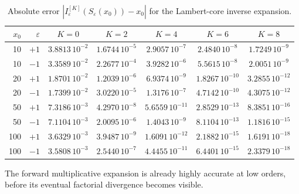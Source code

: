 \documentclass[11pt]{article}
\theoremstyle{definition}
\theoremstyle{remark}
\newcommand{\eps}{\varepsilon}
\begin{document}
\begin{table}[htbp]
\centering
\caption{Absolute error $|I_\eps^{[K]}(S_\eps(x_0))-x_0|$ for the Lambert-core inverse expansion.}
\label{tab:inverse-errors}
\small
\begin{tabular}{@{}rrccccc@{}}
\toprule
$x_0$ & $\eps$ & $K=0$ & $K=2$ & $K=4$ & $K=6$ & $K=8$\\
\midrule
10  & $+1$ & $3.8813\,10^{-2}$ & $1.6744\,10^{-5}$ & $2.9057\,10^{-7}$ & $2.4840\,10^{-8}$ & $1.7249\,10^{-9}$\\
10  & $-1$ & $3.3589\,10^{-2}$ & $2.2677\,10^{-4}$ & $3.9282\,10^{-6}$ & $5.5615\,10^{-8}$ & $2.0051\,10^{-9}$\\
20  & $+1$ & $1.8701\,10^{-2}$ & $1.2039\,10^{-6}$ & $6.9374\,10^{-9}$ & $1.8267\,10^{-10}$ & $3.2855\,10^{-12}$\\
20  & $-1$ & $1.7399\,10^{-2}$ & $3.0220\,10^{-5}$ & $1.3176\,10^{-7}$ & $4.7142\,10^{-10}$ & $4.3075\,10^{-12}$\\
50  & $+1$ & $7.3186\,10^{-3}$ & $4.2970\,10^{-8}$ & $5.6559\,10^{-11}$ & $2.8529\,10^{-13}$ & $8.3851\,10^{-16}$\\
50  & $-1$ & $7.1104\,10^{-3}$ & $2.0095\,10^{-6}$ & $1.4043\,10^{-9}$ & $8.1104\,10^{-13}$ & $1.1816\,10^{-15}$\\
100 & $+1$ & $3.6329\,10^{-3}$ & $3.9487\,10^{-9}$ & $1.6091\,10^{-12}$ & $2.1882\,10^{-15}$ & $1.6191\,10^{-18}$\\
100 & $-1$ & $3.5808\,10^{-3}$ & $2.5440\,10^{-7}$ & $4.4455\,10^{-11}$ & $6.4401\,10^{-15}$ & $2.3379\,10^{-18}$\\
\bottomrule
\end{tabular}
\end{table}

The forward multiplicative expansion is already highly accurate at low orders, before its eventual factorial divergence becomes visible.
\end{document}
